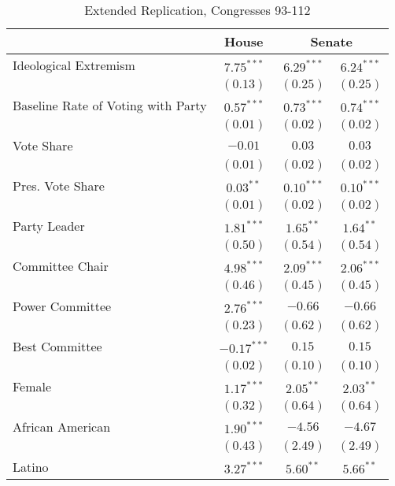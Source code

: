 \documentclass[12pt]{article}
\begin{document}
\begin{table}[H]
	\begin{center}
		\caption{Extended Replication, Congresses 93-112}
		\singlespacing
		\begin{tabular}{l c c c }
			\hline
			& House & \multicolumn{2}{c}{Senate} \\
			\hline
			Ideological Extremism & $7.75^{***}$  & $6.29^{***}$  & $6.24^{***}$  \\
			& $(0.13)$      & $(0.25)$      & $(0.25)$      \\
			Baseline Rate of Voting with Party              & $0.57^{***}$  & $0.73^{***}$  & $0.74^{***}$  \\
			& $(0.01)$      & $(0.02)$      & $(0.02)$      \\
			Vote Share            & $-0.01$       & $0.03$        & $0.03$        \\
			& $(0.01)$      & $(0.02)$      & $(0.02)$      \\
			Pres. Vote Share      & $0.03^{**}$   & $0.10^{***}$  & $0.10^{***}$  \\
			& $(0.01)$      & $(0.02)$      & $(0.02)$      \\
			Party Leader                 & $1.81^{***}$  & $1.65^{**}$   & $1.64^{**}$   \\
			& $(0.50)$      & $(0.54)$      & $(0.54)$      \\
			Committee Chair                  & $4.98^{***}$  & $2.09^{***}$  & $2.06^{***}$  \\
			& $(0.46)$      & $(0.45)$      & $(0.45)$      \\
			Power Committee       & $2.76^{***}$  & $-0.66$       & $-0.66$       \\
			& $(0.23)$      & $(0.62)$      & $(0.62)$      \\
			Best Committee        & $-0.17^{***}$ & $0.15$        & $0.15$        \\
			& $(0.02)$      & $(0.10)$      & $(0.10)$      \\
			Female                 & $1.17^{***}$  & $2.05^{**}$   & $2.03^{**}$   \\
			& $(0.32)$      & $(0.64)$      & $(0.64)$      \\
			African American                   & $1.90^{***}$  & $-4.56$       & $-4.67$       \\
			& $(0.43)$      & $(2.49)$      & $(2.49)$      \\
			Latino                 & $3.27^{***}$  & $5.60^{**}$   & $5.66^{**}$   \\

\end{tabular}
\end{center}
\end{table}
\end{document}
